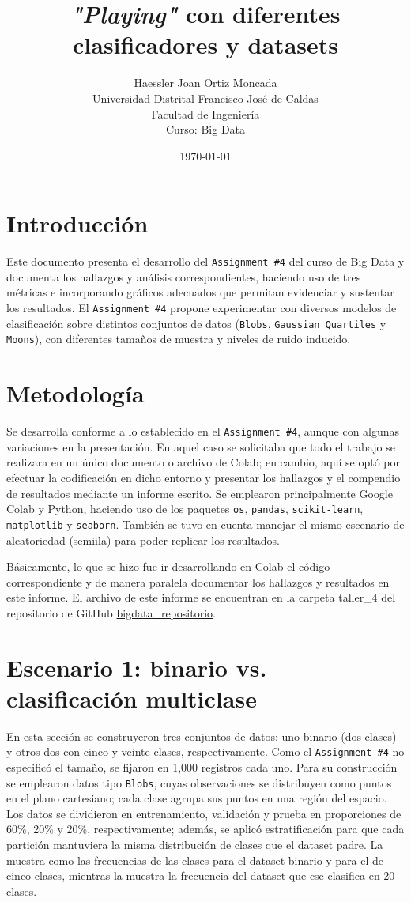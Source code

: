 \documentclass[12pt,a4paper]{article}
\title{\textbf{\textit{"Playing"} con diferentes clasificadores y datasets}}
\author{Haessler Joan Ortiz Moncada \\[0.5cm]
        Universidad Distrital Francisco José de Caldas \\
        Facultad de Ingeniería \\
        Curso: Big Data}
\date{\today}
\begin{document}
\maketitle

\section{Introducción}
Este documento presenta el desarrollo del \texttt{Assignment \#4} del curso de Big Data y documenta 
los hallazgos y análisis correspondientes, haciendo uso de tres métricas e incorporando gráficos 
adecuados que permitan evidenciar y sustentar los resultados. El \texttt{Assignment \#4} propone 
experimentar con diversos modelos de clasificación sobre distintos conjuntos de datos (\texttt{Blobs}, 
\texttt{Gaussian Quartiles} y \texttt{Moons}), con diferentes tamaños de muestra y niveles de ruido 
inducido.

\section{Metodología}
Se desarrolla conforme a lo establecido en el \texttt{Assignment \#4}, aunque con algunas variaciones 
en la presentación. En aquel caso se solicitaba que todo el trabajo se realizara en un único documento o 
archivo de Colab; en cambio, aquí se optó por efectuar la codificación en dicho entorno y presentar los 
hallazgos y el compendio de resultados mediante un informe escrito. Se emplearon principalmente Google Colab y Python, 
haciendo uso de los paquetes \texttt{os}, \texttt{pandas}, \texttt{scikit-learn}, \texttt{matplotlib} y \texttt{seaborn}.
También se tuvo en cuenta manejar el mismo escenario de aleatoriedad (semiila) para poder replicar los resultados.

Básicamente, lo que se hizo fue ir desarrollando en Colab el código correspondiente y de manera 
paralela documentar los hallazgos y resultados en este informe. El archivo de este informe se encuentran en la carpeta taller\_4 del repositorio de 
GitHub \href{https://github.com/HaesslerOrtiz/bigdata}{bigdata\_repositorio}.

\section{Escenario 1: binario vs. clasificación multiclase}
En esta sección se construyeron tres conjuntos de datos: uno binario (dos clases) y otros dos con cinco y veinte clases, 
respectivamente. Como el \texttt{Assignment \#4} no especificó el tamaño, se fijaron en 1,000 registros cada uno. Para 
su construcción se emplearon datos tipo \texttt{Blobs}, cuyas observaciones se distribuyen como puntos en el plano 
cartesiano; cada clase agrupa sus puntos en una región del espacio. Los datos se dividieron en entrenamiento, validación 
y prueba en proporciones de 60\%, 20\% y 20\%, respectivamente; además, se aplicó estratificación para que cada partición 
mantuviera la misma distribución de clases que el dataset padre. La  muestra como las frecuencias 
de las clases para el dataset binario y para el de cinco clases, mientras la  muestra la frecuencia 
del dataset que cse clasifica en 20 clases.
\end{document}
